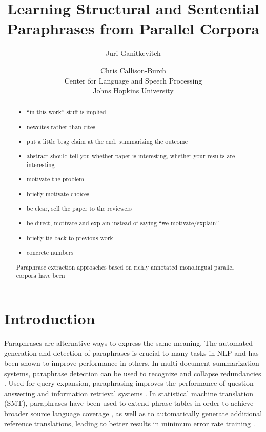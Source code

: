 \documentclass[11pt]{article}
\title{Learning Structural and Sentential Paraphrases from Parallel Corpora}
\author{Juri Ganitkevitch \and Chris Callison-Burch\\ 
Center for Language and Speech Processing\\ 
Johns Hopkins University}
\date{}
\begin{document}
\maketitle

\begin{abstract}
  \begin{itemize}
  \item ``in this work'' stuff is implied
  \item newcites rather than cites 
  \item put a little brag claim at the end, summarizing the outcome
  \item abstract should tell you whether paper is interesting, whether
    your results are interesting
  \item motivate the problem
  \item briefly motivate choices
  \item be clear, sell the paper to the reviewers
  \item be direct, motivate and explain instead of saying ``we
    motivate/explain''
  \item briefly tie back to previous work
  \item concrete numbers
  \end{itemize}
  Paraphrase extraction approaches based on richly annotated
  monolingual parallel corpora have been
\end{abstract}

\section{Introduction} \label{introduction}

Paraphrases are alternative ways to express the same meaning. The
automated generation and detection of paraphrases is crucial to many
tasks in NLP and has been shown to improve performance in others. In
multi-document summarization systems, paraphrase detection can be used
to recognize and collapse redundancies \cite{Barzilay1999}. Used for
query expansion, paraphrasing improves the performance of question
answering \cite{Ravichandran2002,Riezler2007} and information
retrieval systems \cite{Anick1999}. In statistical machine translation (SMT),
paraphrases have been used to extend phrase tables in order to achieve
broader source language coverage \cite{Callison-Burch2006b}, as well
as to automatically generate additional reference translations,
leading to better results in minimum error rate training
\cite{Madnani2007}.
\end{document}

